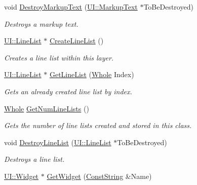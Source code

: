 \begin{DoxyCompactItemize}
void \hyperlink{classphys_1_1UILayer_a75d488037b5bcc97e88249de10ba1d64}{DestroyMarkupText} (\hyperlink{classphys_1_1UI_1_1MarkupText}{UI::MarkupText} $\ast$ToBeDestroyed)
\begin{DoxyCompactList}\small\item\em Destroys a markup text. \item\end{DoxyCompactList}\item 
\hypertarget{classphys_1_1UILayer_a2b0fb7ef867d4cdbdf5e51a2d25407dc}{
\hyperlink{classphys_1_1UI_1_1LineList}{UI::LineList} $\ast$ \hyperlink{classphys_1_1UILayer_a2b0fb7ef867d4cdbdf5e51a2d25407dc}{CreateLineList} ()}
\label{da/d48/classphys_1_1UILayer_a2b0fb7ef867d4cdbdf5e51a2d25407dc}

\begin{DoxyCompactList}\small\item\em Creates a line list within this layer. \item\end{DoxyCompactList}\item 
\hyperlink{classphys_1_1UI_1_1LineList}{UI::LineList} $\ast$ \hyperlink{classphys_1_1UILayer_abba7c9e3e937db7091254b2683af5ea1}{GetLineList} (\hyperlink{namespacephys_a460f6bc24c8dd347b05e0366ae34f34a}{Whole} Index)
\begin{DoxyCompactList}\small\item\em Gets an already created line list by index. \item\end{DoxyCompactList}\item 
\hyperlink{namespacephys_a460f6bc24c8dd347b05e0366ae34f34a}{Whole} \hyperlink{classphys_1_1UILayer_a746f83b806660debc3104fd90dc57d32}{GetNumLineLists} ()
\begin{DoxyCompactList}\small\item\em Gets the number of line lists created and stored in this class. \item\end{DoxyCompactList}\item 
void \hyperlink{classphys_1_1UILayer_a8a8cbbfbf37c9d54c12de4c235f52ac2}{DestroyLineList} (\hyperlink{classphys_1_1UI_1_1LineList}{UI::LineList} $\ast$ToBeDestroyed)
\begin{DoxyCompactList}\small\item\em Destroys a line list. \item\end{DoxyCompactList}\item 
\hyperlink{classphys_1_1UI_1_1Widget}{UI::Widget} $\ast$ \hyperlink{classphys_1_1UILayer_afcc3fd6ff5d0731aa57f1012deea7214}{GetWidget} (\hyperlink{namespacephys_a5ce5049f8b4bf88d6413c47b504ebb31}{ConstString} \&Name)

\end{DoxyCompactItemize}
